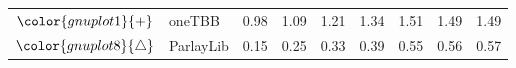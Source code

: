\begin{tabular}{clrrrrrrr}
\rowcolor{gnuplot1!10}$\color{gnuplot1}{+}$ & oneTBB & \cellcolor{gnuplot1!10} 0.98 & \cellcolor{gnuplot1!10} 1.09 & \cellcolor{gnuplot1!10} 1.21 & \cellcolor{gnuplot1!10} 1.34 & \cellcolor{gnuplot1!10} 1.51 & \cellcolor{gnuplot1!10} 1.49 & \cellcolor{gnuplot1!10} 1.49 \\
\rowcolor{gnuplot8!10}$\color{gnuplot8}{\triangle}$ & ParlayLib & \cellcolor{gnuplot8!10} 0.15 & \cellcolor{gnuplot8!10} 0.25 & \cellcolor{gnuplot8!10} 0.33 & \cellcolor{gnuplot8!10} 0.39 & \cellcolor{gnuplot8!10} 0.55 & \cellcolor{gnuplot8!10} 0.56 & \cellcolor{gnuplot8!10} 0.57 \\
\bottomrule
\end{tabular}
